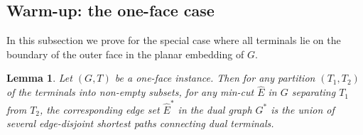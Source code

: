 \documentclass[11pt]{article}
\newtheorem{lemma}[theorem]{Lemma}
\theoremstyle{definition}
\begin{document}
\subsection{Warm-up: the one-face case}
\label{sec: 1-face}

In this subsection we prove  for the special case where all terminals lie on the boundary of the outer face in the planar embedding of $G$.



\begin{lemma}
	\label{lem: mincut structure}
Let $(G,T)$ be a one-face instance. Then for any partition $(T_1,T_2)$ of the terminals into non-empty subsets, for any min-cut $\hat E$ in $G$ separating $T_1$ from $T_2$, the corresponding edge set $\hat E^*$ in the dual graph $G^*$ is the union of several edge-disjoint shortest paths connecting dual terminals.
\end{lemma}
\end{document}
